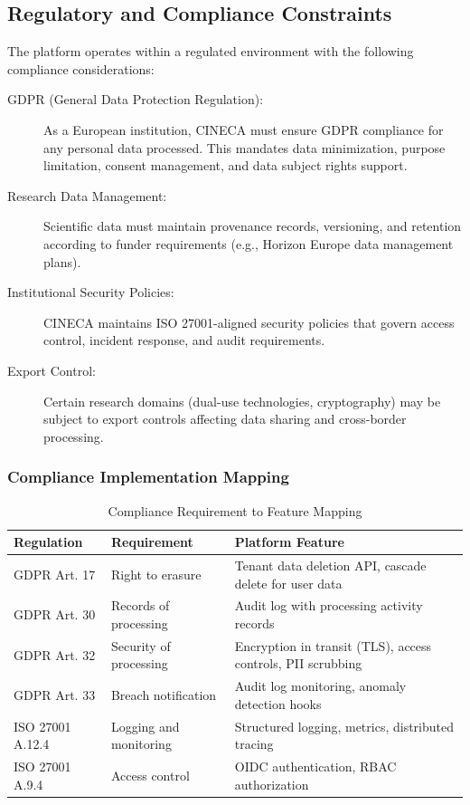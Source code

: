 \subsection{Regulatory and Compliance Constraints}
\label{subsec:compliance-constraints}

The platform operates within a regulated environment with the following compliance considerations:

\begin{description}
    \item[GDPR (General Data Protection Regulation):] As a European institution, CINECA must ensure GDPR compliance for any personal data processed. This mandates data minimization, purpose limitation, consent management, and data subject rights support.
    
    \item[Research Data Management:] Scientific data must maintain provenance records, versioning, and retention according to funder requirements (e.g., Horizon Europe data management plans).
    
    \item[Institutional Security Policies:] CINECA maintains ISO 27001-aligned security policies that govern access control, incident response, and audit requirements.
    
    \item[Export Control:] Certain research domains (dual-use technologies, cryptography) may be subject to export controls affecting data sharing and cross-border processing.
\end{description}

\subsubsection{Compliance Implementation Mapping}

\begin{table}[htbp]
\centering
\caption{Compliance Requirement to Feature Mapping}
\label{tab:compliance-mapping}
\small
\begin{tabular}{|l|l|p{6cm}|}
\hline
\textbf{Regulation} & \textbf{Requirement} & \textbf{Platform Feature} \\
\hline
GDPR Art. 17 & Right to erasure & Tenant data deletion API, cascade delete for user data \\
\hline
GDPR Art. 30 & Records of processing & Audit log with processing activity records \\
\hline
GDPR Art. 32 & Security of processing & Encryption in transit (TLS), access controls, PII scrubbing \\
\hline
GDPR Art. 33 & Breach notification & Audit log monitoring, anomaly detection hooks \\
\hline
ISO 27001 A.12.4 & Logging and monitoring & Structured logging, metrics, distributed tracing \\
\hline
ISO 27001 A.9.4 & Access control & OIDC authentication, RBAC authorization \\
\hline
\end{tabular}
\end{table}

